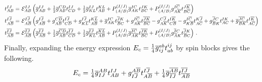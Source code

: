 \documentclass[11pt,fleqn]{article}
\begin{document}
\begin{align*}
  t_{AB}^{IJ}
=&\
  \mathcal{E}_{AB}^{IJ}
  \left(
    \overline{g}_{AB}^{IJ}
  +
    \tfrac{1}{2}
    \overline{g}_{AB}^{CD}
    t_{CD}^{IJ}
  +
    \tfrac{1}{2}
    \overline{g}_{KL}^{IJ}
    t_{AB}^{KL}
  +
    P^{(I/J)}_{(A/B)}
    \overline{g}_{AK}^{IC}
    t_{BC}^{JK}
  +
    P^{(I/J)}_{(A/B)}
    g_{A\overline{K}}^{I\overline{C}}
    t_{B\overline{C}}^{J\overline{K}}
  \right)
\\
  t_{A\overline{B}}^{I\overline{J}}
=&\
  \mathcal{E}_{A\overline{B}}^{I\overline{J}}
  \left(
    g_{A\overline{B}}^{I\overline{J}}
  +
    g_{A\overline{B}}^{C\overline{D}}
    t_{C\overline{D}}^{I\overline{J}}
  +
    g_{K\overline{L}}^{I\overline{J}}
    t_{A\overline{B}}^{K\overline{L}}
  +
    \overline{g}_{AK}^{IC}
    t_{\overline{B}C}^{\overline{J}K}
  +
    g_{A\overline{K}}^{I\overline{C}}
    t_{\overline{B}\overline{C}}^{\overline{J}\overline{K}}
  -
    g_{A\overline{K}}^{C\overline{J}}
    t_{C\overline{B}}^{I\overline{K}}
  -
    g_{K\overline{B}}^{I\overline{C}}
    t_{A\overline{C}}^{K\overline{J}}
  +
    g_{\overline{B}K}^{\overline{J}C}
    t_{AC}^{IK}
  +
    \overline{g}_{\overline{B}\overline{K}}^{\overline{J}\overline{C}}
    t_{A\overline{C}}^{I\overline{K}}
  \right)
\\
  t_{\overline{A}\overline{B}}^{\overline{I}\overline{J}}
=&\
  \mathcal{E}_{\overline{A}\overline{B}}^{\overline{I}\overline{J}}
  \left(
    \overline{g}_{\overline{A}\overline{B}}^{\overline{I}\overline{J}}
  +
    \tfrac{1}{2}
    \overline{g}_{\overline{A}\overline{B}}^{\overline{C}\overline{D}}
    t_{\overline{C}\overline{D}}^{\overline{I}\overline{J}}
  +
    \tfrac{1}{2}
    \overline{g}_{\overline{K}\overline{L}}^{\overline{I}\overline{J}}
    t_{\overline{A}\overline{B}}^{\overline{K}\overline{L}}
  +
    P^{(I/J)}_{(A/B)}
    \overline{g}_{\overline{A}\overline{K}}^{\overline{I}\overline{C}}
    t_{\overline{B}\overline{C}}^{\overline{J}\overline{K}}
  +
    P^{(I/J)}_{(A/B)}
    g_{\overline{A}K}^{\overline{I}C}
    t_{\overline{B}C}^{\overline{J}K}
  \right)\,.
\end{align*}
Finally, expanding the energy expression $E_c=\tfrac{1}{4}\overline{g}_{ij}^{ab}t_{ab}^{ij}$ by spin blocks gives the following.
\begin{align*}
  E_c
=
  \tfrac{1}{4}
  \overline{g}_{IJ}^{AB}
  t_{AB}^{IJ}
+
  g_{I\overline{J}}^{A\overline{B}}
  t_{A\overline{B}}^{I\overline{J}}
+
  \tfrac{1}{4}
  \overline{g}_{\overline{I}\overline{J}}^{\overline{A}\overline{B}}
  t_{\overline{A}\overline{B}}^{\overline{I}\overline{J}}
\end{align*}
\end{document}
